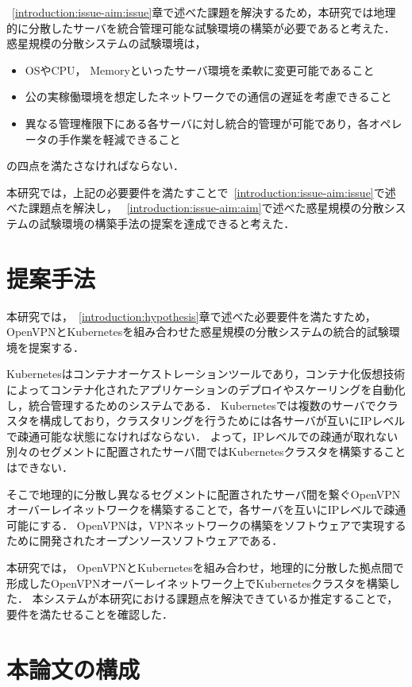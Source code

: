 ~\ref{introduction:issue-aim:issue}章で述べた課題を解決するため，本研究では地理的に分散したサーバを統合管理可能な試験環境の構築が必要であると考えた．
惑星規模の分散システムの試験環境は，
\begin{itemize}
  \item OSやCPU， Memoryといったサーバ環境を柔軟に変更可能であること
  \item 公の実稼働環境を想定したネットワークでの通信の遅延を考慮できること
  \item 異なる管理権限下にある各サーバに対し統合的管理が可能であり，各オペレータの手作業を軽減できること
\end{itemize}
の四点を満たさなければならない．

本研究では，上記の必要要件を満たすことで~\ref{introduction:issue-aim:issue}で述べた課題点を解決し，
~\ref{introduction:issue-aim:aim}で述べた惑星規模の分散システムの試験環境の構築手法の提案を達成できると考えた．

\section{提案手法}
\label{introduction:proposal}

本研究では，~\ref{introduction:hypothesis}章で述べた必要要件を満たすため，OpenVPNとKubernetesを組み合わせた惑星規模の分散システムの統合的試験環境を提案する．

Kubernetesはコンテナオーケストレーションツールであり，コンテナ化仮想技術によってコンテナ化されたアプリケーションのデプロイやスケーリングを自動化し，統合管理するためのシステムである．
Kubernetesでは複数のサーバでクラスタを構成しており，クラスタリングを行うためには各サーバが互いにIPレベルで疎通可能な状態になければならない．
よって，IPレベルでの疎通が取れない別々のセグメントに配置されたサーバ間ではKubernetesクラスタを構築することはできない．

そこで地理的に分散し異なるセグメントに配置されたサーバ間を繋ぐOpenVPNオーバーレイネットワークを構築することで，各サーバを互いにIPレベルで疎通可能にする．
OpenVPNは，VPNネットワークの構築をソフトウェアで実現するために開発されたオープンソースソフトウェアである．

本研究では， OpenVPNとKubernetesを組み合わせ，地理的に分散した拠点間で形成したOpenVPNオーバーレイネットワーク上でKubernetesクラスタを構築した．
本システムが本研究における課題点を解決できているか推定することで，要件を満たせることを確認した．

\section{本論文の構成}
\label{introduction:structure}

